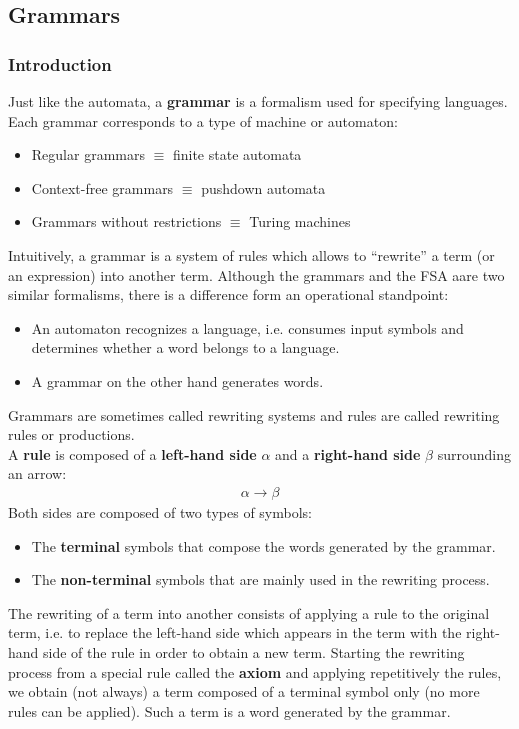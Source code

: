 \subsection{Grammars}
\subsubsection{Introduction}
Just like the automata, a \textbf{grammar} is a formalism used for specifying languages.
Each grammar corresponds to a type of machine or automaton:
\begin{itemize}
  \item Regular grammars $\equiv$ finite state automata
  \item Context-free grammars $\equiv$ pushdown automata
  \item Grammars without restrictions $\equiv$ Turing machines
\end{itemize}
Intuitively, a grammar is a system of rules which allows to ``rewrite'' a term (or an expression)
into another term. Although the grammars and the FSA aare two similar formalisms,
there is a difference form an operational standpoint:
\begin{itemize}
  \item An automaton recognizes a language, i.e. consumes input symbols 
        and determines whether a word belongs to a language.
  \item A grammar on the other hand generates words.
\end{itemize}
Grammars are sometimes called rewriting systems and rules are called rewriting rules or productions.\\

A \textbf{rule} is composed of a \textbf{left-hand side} $\alpha$ and a \textbf{right-hand side} $\beta$ surrounding an arrow:
\begin{align*}
  \alpha \rightarrow \beta
\end{align*}
Both sides are composed of two types of symbols:
\begin{itemize}
  \item The \textbf{terminal} symbols that compose the words generated by the grammar.
  \item The \textbf{non-terminal} symbols that are mainly used in the rewriting process.
\end{itemize}
The rewriting of a term into another consists of applying a rule to the original term, i.e. to replace
the left-hand side which appears in the term with the right-hand side of the rule in order to obtain a new term.
Starting the rewriting process from a special rule called the \textbf{axiom} and applying repetitively the rules,
we obtain (not always) a term composed of a terminal symbol only (no more rules can be applied). Such a term 
is a word generated by the grammar.\\

